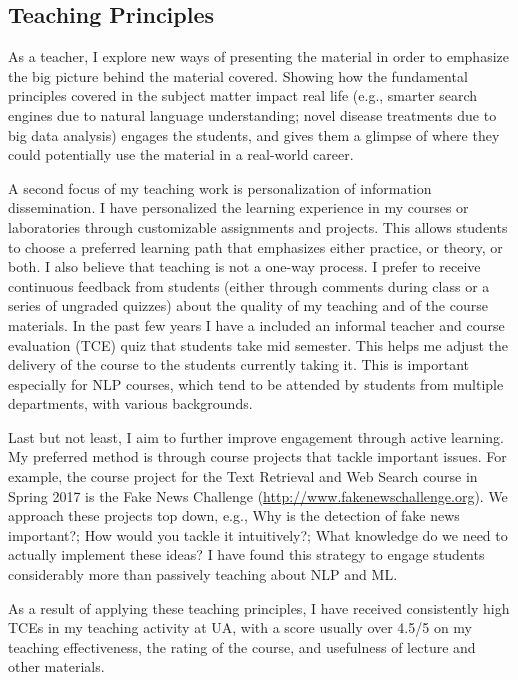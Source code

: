 \documentclass[10pt]{article}
\begin{document}
\subsection*{Teaching Principles}

As a teacher, I explore new ways of presenting the material in order to emphasize the big picture behind the material covered. Showing how the fundamental principles covered in the subject matter impact real life (e.g., smarter search engines due to natural language understanding; novel disease treatments due to big data analysis) engages the students, and gives them a glimpse of where they could potentially use the material in a real-world career.

A second focus of my teaching work is personalization of information dissemination. 
I have personalized the learning experience in my courses or laboratories through customizable assignments and projects. This allows students to choose a preferred learning path that emphasizes either practice, or theory, or both.
I also believe that teaching is not a one-way process. I prefer to receive continuous feedback from students (either through comments during class or a series of ungraded quizzes) about the quality of my teaching and of the course materials. In the past few years I have a included an informal teacher and course evaluation (TCE) quiz that students take mid semester. This helps me adjust the delivery of the course to the students currently taking it. This is important especially for NLP courses, which tend to be attended by students from multiple departments, with various backgrounds. 

Last but not least, I aim to further improve engagement through active learning. My preferred method is through course projects that tackle important issues. For example, the course project for the Text Retrieval and Web Search course in Spring 2017 is the Fake News Challenge (\url{http://www.fakenewschallenge.org}). We approach these projects top down, e.g., Why is the detection of fake news important?; How would you tackle it intuitively?; What knowledge do we need to actually implement these ideas? I have found this strategy to engage students considerably more than passively teaching about NLP and ML. 

As a result of applying these teaching principles, I have received consistently high TCEs in my teaching activity at UA, with a score usually over 4.5/5 on my teaching effectiveness, the rating of the course, and usefulness of lecture and other materials. 
\end{document}
